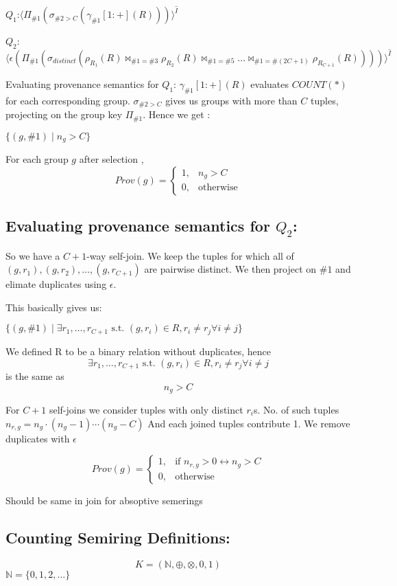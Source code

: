 \documentclass{article}
\begin{document}
$Q_1$:$\langle\Pi_{\#1}(\sigma_{\#2>C}(\gamma_{\#1}[1:+](R)))\rangle^{\hat I}$

$Q_2$: $\langle \epsilon(\Pi_{\#1}(\sigma_{distinct}(\rho_{R_1}(R)\bowtie_{\#1=\#3} \rho_{R_2}(R)\bowtie_{\#1=\#5}\dots\bowtie_{\#1=\#(2C+1)}\rho_{R_{C+1}}(R))))\rangle^{\hat I}$

Evaluating provenance semantics for $Q_1$:
$\gamma_{\#1}[1:+](R)$ evaluates $COUNT(*)$ for each corresponding group. $\sigma_{\#2>C}$ gives us groups with more than $C$ tuples, projecting on the group key $\Pi_{\#1}$.
Hence we get :

$\{ (g,\#1) \mid n_g > C \}$

For each group $g$ after selection ,
$$Prov(g) = \begin{cases}
   1, & n_g > C \\
   0, & \text{otherwise}
   \end{cases}$$

\subsection{Evaluating provenance semantics for $Q_2$:}

So we have a $C+1$-way self-join.
We keep the tuples for which  all of $(g,r_1),(g,r_2),\dots,(g,r_{C+1})$ are pairwise distinct. We then project on $\#1$ and elimate duplicates using $\epsilon$.

This basically gives us:

$\{(g,\#1) \mid \exists r_1,\dots,r_{C+1} \text{  s.t. } (g,r_i) \in R, r_i\neq r_j \forall i \neq j  \}$

We defined R to be a binary relation without duplicates, hence $$\exists r_1,\dots,r_{C+1} \text{  s.t. } (g,r_i) \in R, r_i\neq r_j \forall i \neq j $$ is the same as $$n_g>C$$


For $C+1$ self-joins we consider tuples with only distinct $r_i$s.
No. of such tuples $n_{r, g}= n_g \cdot (n_g-1) \cdots (n_g - C)$
And each joined tuples contribute 1. 
We remove duplicates with $\epsilon$

$$Prov(g) = \begin{cases}
   1, & \text{if } n_{r, g} > 0 \leftrightarrow n_g > C \\
   0, & \text{otherwise}
   \end{cases}$$




Should be same in join for absoptive semerings

\subsection{Counting Semiring Definitions:}
$$K = (\mathbb{N}, \oplus, \otimes, 0, 1)$$
$\mathbb{N} = \{0,1,2,\dots\}$
\end{document}

